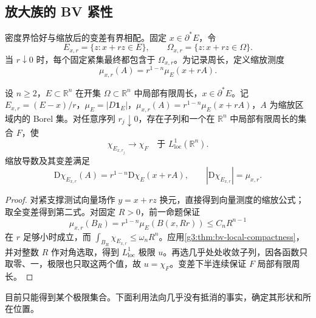 \subsection{放大族的 BV 紧性}
\label{g3:subsec:2104:02}
密度界恰好与缩放后的变差有界相配。固定 \(x\in\partial^*E\)，令
\[
	E_{x,r}=\{z:x+rz\in E\},\qquad
	\Omega_{x,r}=\{z:x+rz\in\Omega\}.
\]
当 \(r\downarrow0\) 时，每个固定紧集最终都包含于 \(\Omega_{x,r}\)。为记录周长，定义缩放测度
\[
	\mu_{x,r}(A)=r^{1-n}\mu_E(x+rA).
\]

\begin{lemma}\label{g3:lem:perimeter-blowup-compactness}
	设 \(n\ge2\)，\(E\subset\mathbb R^n\) 在开集 \(\Omega\subset\mathbb R^n\) 中局部有限周长，\(x\in\partial^*E\)。记 \(E_{x,r}=(E-x)/r\)，\(\mu_E=|D\mathbf1_E|\)，\(\mu_{x,r}(A)=r^{1-n}\mu_E(x+rA)\)，\(A\) 为缩放区域内的 Borel 集。对任意序列 \(r_j\downarrow0\)，存在子列和一个在 \(\mathbb R^n\) 中局部有限周长的集合 \(F\)，使
	\[
		\chi_{E_{x,r_j}}\longrightarrow\chi_F
		\quad\text{于 }L^1_{\mathrm{loc}}(\mathbb R^n).
	\]
	缩放导数及其变差满足
	\begin{equation}\label{g3:eq:perimeter-scaling}
		\mathrm D\chi_{E_{x,r}}(A)
		=r^{1-n}\mathrm D\chi_E(x+rA),\qquad
		|\mathrm D\chi_{E_{x,r}}|=\mu_{x,r}.
	\end{equation}
\end{lemma}
\begin{proof}
	对紧支撑测试向量场作 \(y=x+rz\) 换元，直接得到向量测度的缩放公式；取全变差得到第二式。对固定 \(R>0\)，前一命题保证
	\[
		\mu_{x,r}(B_R)
		=r^{1-n}\mu_E(B(x,Rr))\le C_nR^{n-1}
	\]
	在 \(r\) 足够小时成立，而 \(\int_{B_R}\chi_{E_{x,r}}\le\omega_nR^n\)。应用\cref{g3:thm:bv-local-compactness}，并对整数 \(R\) 作对角选取，得到 \(L^1_{\mathrm{loc}}\) 极限 \(u\)。再选几乎处处收敛子列，因各函数只取零、一，极限也只取这两个值，故 \(u=\chi_F\)。变差下半连续保证 \(F\) 局部有限周长。
\end{proof}

目前只能得到某个极限集合。下面利用法向几乎没有抵消的事实，确定其形状和所在位置。

